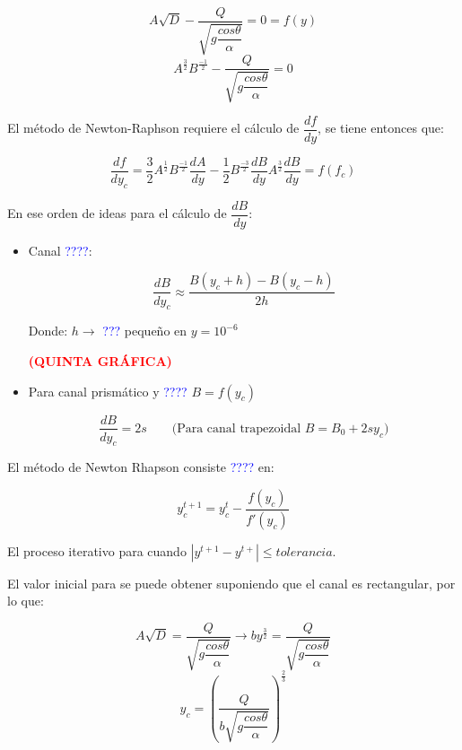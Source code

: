 \documentclass[11pt, oneside]{article}
\begin{document}
$$A\sqrt{D}-\dfrac{Q}{\sqrt{g\dfrac{cos\theta}{\alpha}}}=0=f(y)$$
$$A^{\frac{3}{2}}B^{\frac{-1}{2}}-\dfrac{Q}{\sqrt{g\dfrac{cos\theta}{\alpha}}}=0$$

El método de Newton-Raphson requiere el cálculo de $\dfrac{df}{dy}$, se tiene entonces que:


$$\dfrac{df}{dy_{c}}=\dfrac{3}{2}A^{\frac{1}{2}}B^{\frac{-1}{2}}\dfrac{dA}{dy}-\dfrac{1}{2}B^{\frac{-3}{2}}\dfrac{dB}{dy}A^{\frac{3}{2}}\dfrac{dB}{dy}=f(f_{c})$$


En ese orden de ideas para el cálculo de $\dfrac{dB}{dy}$:


\begin{itemize}
    \item Canal \textcolor{blue}{????}:

    $$\dfrac{dB}{dy_{c}}\approx\dfrac{B(y_{c}+h)-B(y_c-h)}{2h}$$

    Donde: $h\rightarrow$ \textcolor{blue}{???} pequeño en $y=10^{-6}$

    \textcolor{red}{\textbf{(QUINTA GRÁFICA)}} \vspace{1ex}

    \item Para canal prismático y \textcolor{blue}{????} $B=f(y_{c})$

    $$\dfrac{dB}{dy_{c}}=2s \qquad \text{(Para canal trapezoidal $B=B_{0}+2sy_{c}$)}$$

\end{itemize}

El método de Newton Rhapson consiste \textcolor{blue}{????} en:

$$y^{t+1}_{c}=y^{t}_{c}-\dfrac{f(y_c)}{f'(y_c)}$$

El proceso iterativo para cuando $|y^{t+1}-y^{t+}|\leq tolerancia$.

El valor inicial para se puede obtener suponiendo que el canal es rectangular, por lo que:

$$A\sqrt{D}=\dfrac{Q}{\sqrt{g\dfrac{cos\theta}{\alpha}}}\rightarrow by^{\frac{3}{2}}=\dfrac{Q}{\sqrt{g\dfrac{cos\theta}{\alpha}}}$$
$$y_{c}=\left(\dfrac{Q}{b\sqrt{g\dfrac{cos\theta}{\alpha}}}\right)^{\frac{2}{3}}$$
\end{document}
